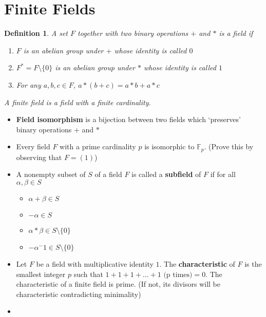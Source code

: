 \documentclass[a4paper]{article}
\theoremstyle{dotless}
\theoremstyle{dotless}
\newtheorem{defn}{Definition}[section]
\theoremstyle{remark}
\begin{document}
\section{Finite Fields}
\begin{defn}
A set $F$ together with two binary operations $+$ and $*$ is a field if
\begin{enumerate}
\item $F$ is an abelian group under $+$ whose identity is called $0$
\item $F^* = F \setminus \{0\} $ is an abelian group under $*$ whose identity is called $1$
\item For any $a,b,c \in F$, $a * (b + c) = a * b + a * c$
\end{enumerate}
A finite field is a field with a finite cardinality.
\end{defn}

\begin{itemize}
\item \textbf{Field isomorphism} is a bijection between two fields which `preserves' binary operations $+$ and $*$
\item Every field $F$ with a prime cardinality $p$ is isomorphic to $\mathbb{F}_p$. (Prove this by observing that $F = (1)$)
\item A nonempty subset of $S$ of a field $F$ is called a \textbf{subfield} of $F$ if for all $\alpha, \beta \in S$
		\begin{itemize}
		\item $\alpha + \beta \in S$
		\item $-\alpha \in S$
		\item $\alpha * \beta \in S\setminus\{0\}$
		\item $-\alpha^-1 \in S\setminus\{0\}$
		\end{itemize}

\item Let $F$ be a field with multiplicative identity $1$. The \textbf{characteristic} of $F$ is the smallest integer $p$ such that $1+1+1+\dots+1 \text{ (p times)} = 0$. The characteristic of a finite field is prime. (If not, its divisors will be characteristic contradicting minimality)
\item 
\end{itemize}
\end{document}
